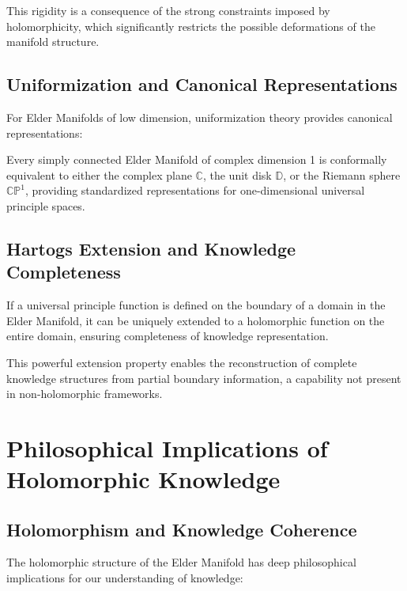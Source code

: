 This rigidity is a consequence of the strong constraints imposed by holomorphicity, which significantly restricts the possible deformations of the manifold structure.

\subsection{Uniformization and Canonical Representations}

For Elder Manifolds of low dimension, uniformization theory provides canonical representations:

\begin{theorem}
Every simply connected Elder Manifold of complex dimension 1 is conformally equivalent to either the complex plane $\mathbb{C}$, the unit disk $\mathbb{D}$, or the Riemann sphere $\mathbb{CP}^1$, providing standardized representations for one-dimensional universal principle spaces.
\end{theorem}

\subsection{Hartogs Extension and Knowledge Completeness}

\begin{theorem}
If a universal principle function is defined on the boundary of a domain in the Elder Manifold, it can be uniquely extended to a holomorphic function on the entire domain, ensuring completeness of knowledge representation.
\end{theorem}

This powerful extension property enables the reconstruction of complete knowledge structures from partial boundary information, a capability not present in non-holomorphic frameworks.

\section{Philosophical Implications of Holomorphic Knowledge}

\subsection{Holomorphism and Knowledge Coherence}

The holomorphic structure of the Elder Manifold has deep philosophical implications for our understanding of knowledge:

